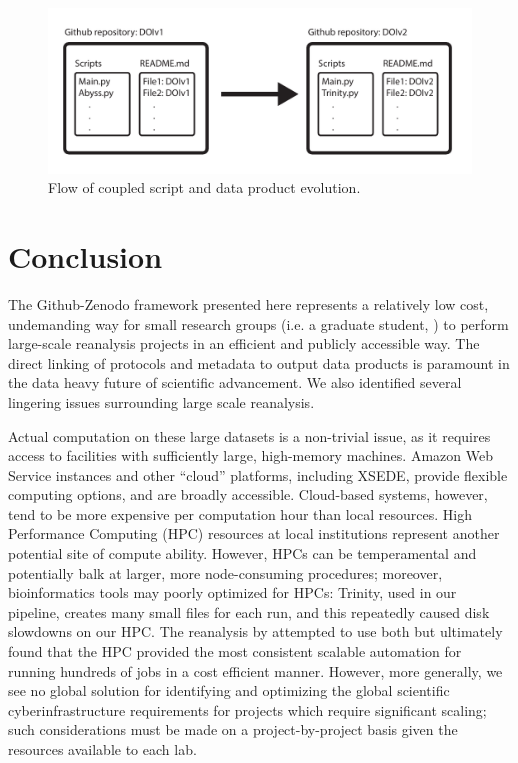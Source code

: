 \documentclass[a4paper,num-refs]{oup-contemporary}
\begin{document}
\begin{figure}
  \centering
  \includegraphics[width=\linewidth]{Diagram.pdf}
  \caption{Flow of coupled script and data product evolution.}
  \label{fig:FlowDiagram}
\end{figure}
\section{Conclusion}

The Github-Zenodo framework presented here represents a relatively low
cost, undemanding way for small research groups (i.e. a graduate
student, ) to perform large-scale reanalysis projects in an efficient
and publicly accessible way. The direct linking of protocols and
metadata to output data products is paramount in the data heavy future
of scientific advancement. We also identified several lingering issues surrounding large scale
reanalysis.

Actual computation on these large datasets is a non-trivial issue, as
it requires access to facilities with sufficiently large, high-memory
machines.  Amazon Web Service instances and other ``cloud'' platforms,
including XSEDE, provide flexible computing options, and are broadly
accessible. Cloud-based systems, however, tend to be more expensive
per computation hour than local resources. High Performance Computing
(HPC) resources at local institutions represent another potential site
of compute ability.  However, HPCs can be temperamental and
potentially balk at larger, more node-consuming procedures; moreover,
bioinformatics tools may poorly optimized for HPCs: Trinity, used in
our pipeline, creates many small files for each run, and this
repeatedly caused disk slowdowns on our HPC.  The reanalysis by
\citet{Johnson2018} attempted to use both but ultimately
found that the HPC provided the most consistent scalable automation
for running hundreds of jobs in a cost efficient manner.  However,
more generally, we see no global solution for identifying and
optimizing the global scientific cyberinfrastructure requirements for
projects which require significant scaling; such considerations must
be made on a project-by-project basis given the resources available to
each lab.
\end{document}
